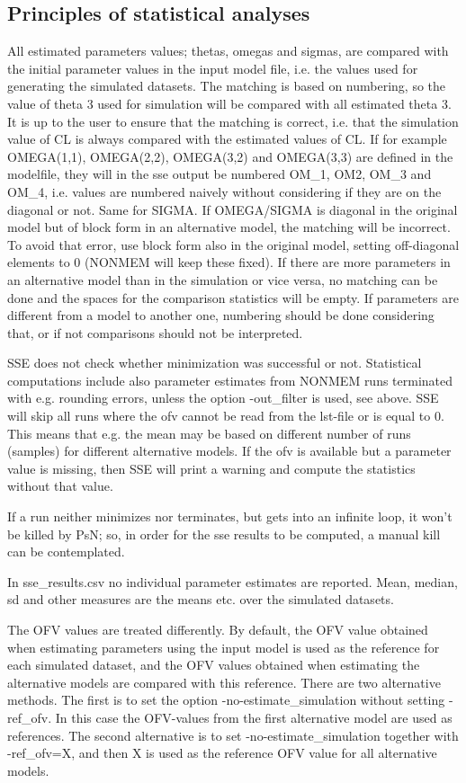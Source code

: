 \subsection{Principles of statistical analyses}

All estimated parameters values; thetas, omegas and sigmas, are compared with the initial parameter values in the input model file, i.e. the values used for generating the simulated datasets. The matching is based on numbering, so the value of theta 3 used for simulation will be compared with all estimated theta 3. It is up to the user to ensure that the matching is correct, i.e. that the simulation value of CL is always compared with the estimated values of CL. If for example OMEGA(1,1), OMEGA(2,2), OMEGA(3,2) and OMEGA(3,3) are defined in the modelfile, they will in the sse output be numbered OM\_1, OM2, OM\_3 and OM\_4, i.e. values are numbered naively without considering if they are on the diagonal or not. Same for SIGMA.  If OMEGA/SIGMA is diagonal in the original model but of block form in an alternative model, the matching will be incorrect. To avoid that error, use block form also in the original model, setting off-diagonal elements to 0 (NONMEM will keep these fixed). If there are more parameters in an alternative model than in the simulation or vice versa, no matching can be done and the spaces for the comparison statistics will be empty. If parameters are different from a model to another one, numbering should be done considering that, or if not comparisons should not be interpreted. 

SSE does not check whether minimization was successful or not. Statistical computations include also parameter estimates from NONMEM runs terminated with e.g. rounding errors, unless the option -out\_filter is used, see above. SSE will skip all runs where the ofv cannot be read from the lst-file  or is equal to 0. This means that e.g. the mean may be based on different number of runs (samples) for different alternative models. If the ofv is available but a parameter value is missing, then SSE will print a warning and compute the statistics without that value. 

If a run neither minimizes nor terminates, but gets into an infinite loop, it won't be killed by PsN; so, in order for the sse results to be computed, a manual kill can be contemplated.

In sse\_results.csv no individual parameter estimates are reported. Mean, median, sd and other measures are the means etc. over the simulated datasets.

The OFV values are treated differently. By default, the OFV value obtained when estimating parameters using the input model is used as the reference for each simulated dataset, and the OFV values obtained when estimating the alternative models are compared with this reference. There are two alternative methods. The first is to set the option -no-estimate\_simulation without setting -ref\_ofv. In this case the OFV-values from the first alternative model are used as references. The second alternative is to set -no-estimate\_simulation together with -ref\_ofv=X, and then X is used as the reference OFV value for all alternative models.


